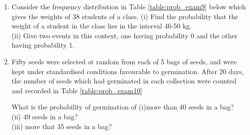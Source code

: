 \begin{enumerate}[label=\thesection.\arabic*.,ref=\thesection.\theenumi]
\begin{table}[!ht]
\centering
{}
\caption{}
\label{table:prob_exam7}
\end{table}
\solution

\item Consider the frequency distribution in Table \ref{table:prob_exam9} below which gives the weights of 38 students of a class.
(i) Find the probability that the weight of a student in the class lies in the interval 46-50 kg.\\
(ii) Give two events in this context, one having probability 0 and the other having probability 1.

%
\begin{table}[!ht]
\centering
{}
\caption{}
\label{table:prob_exam9}
\end{table}
\solution

\item Fifty seeds were selected at random from each of 5 bags of seeds, and were kept under standardised conditions favourable to germination. After 20 days, the
number of seeds which had germinated in each collection were counted and recorded in Table \ref{table:prob_exam10}

What is the probability of germination of
(i)more than 40 seeds in a bag?\\
(ii) 49 seeds in a bag?\\
(iii) more that 35 seeds in a bag?\\


\end{enumerate}
